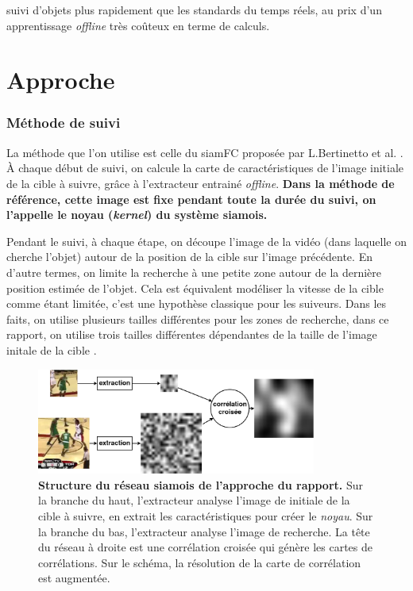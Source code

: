 \documentclass[10pt,twocolumn,letterpaper,french]{article}
\begin{document}
suivi d'objets plus rapidement que les standards du temps réels, au prix d'un apprentissage \textit{offline} très coûteux en terme de calculs. \newpage




\section*{Approche}


\subsubsection*{Méthode de suivi}


La méthode que l'on utilise est celle du siamFC proposée par L.Bertinetto et al. \cite{siamfc}. À chaque début de suivi, on calcule la carte de caractéristiques de l'image initiale de la cible à suivre, grâce à l'extracteur entrainé \textit{offline}. \textbf{Dans la méthode de référence, cette image est fixe pendant toute la durée du suivi, on l'appelle le noyau (\textit{kernel}) du système siamois.}

Pendant le suivi, à chaque étape, on découpe l'image de la vidéo (dans laquelle on cherche l'objet) autour de la position de la cible sur l'image précédente. En d'autre termes, on limite la recherche à une petite zone autour de la dernière position estimée de l'objet. Cela est équivalent modéliser la vitesse de la cible comme étant limitée, c'est une hypothèse classique pour les suiveurs. Dans les faits, on utilise plusieurs tailles différentes pour les zones de recherche, dans ce rapport, on utilise trois tailles différentes dépendantes de la taille de l'image initale de la cible .

\begin{figure}[!h]
  \centering
  \includegraphics[width=260pt]{images/vids/basket/cross.png}
  \caption{\textbf{Structure du réseau siamois de l'approche du rapport.} Sur la branche du haut, l'extracteur analyse l'image de initiale de la cible à suivre, en extrait les caractéristiques pour créer le \textit{noyau}. Sur la branche du bas, l'extracteur analyse l'image de recherche. La tête du réseau à droite est une corrélation croisée qui génère les cartes de corrélations. Sur le schéma, la résolution de la carte de corrélation est augmentée.}
  \label{strucutre}
  \end{figure}
\end{document}
